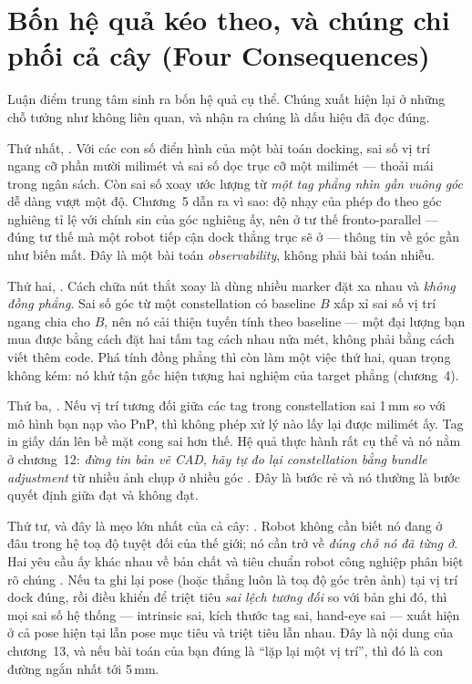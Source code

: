 \documentclass[marker.tex]{subfiles}
\begin{document}
\section*{Bốn hệ quả kéo theo, và chúng chi phối cả cây (Four Consequences)}

Luận điểm trung tâm sinh ra bốn hệ quả cụ thể. Chúng xuất hiện lại ở những chỗ tưởng như không liên quan, và nhận ra chúng là dấu hiệu đã đọc đúng.

Thứ nhất, . Với các con số điển hình của một bài toán docking, sai số vị trí ngang cỡ phần mười milimét và sai số dọc trục cỡ một milimét --- thoải mái trong ngân sách. Còn sai số xoay ước lượng từ \emph{một tag phẳng nhìn gần vuông góc} dễ dàng vượt một độ. Chương~5 dẫn ra vì sao: độ nhạy của phép đo theo góc nghiêng tỉ lệ với chính sin của góc nghiêng ấy, nên ở tư thế fronto-parallel --- đúng tư thế mà một robot tiếp cận dock thẳng trục sẽ ở --- thông tin về góc gần như biến mất. Đây là một bài toán \emph{observability}, không phải bài toán nhiễu.

Thứ hai, . Cách chữa nút thắt xoay là dùng nhiều marker đặt xa nhau và \emph{không đồng phẳng}. Sai số góc từ một constellation có baseline \(B\) xấp xỉ sai số vị trí ngang chia cho \(B\), nên nó cải thiện tuyến tính theo baseline --- một đại lượng bạn mua được bằng cách đặt hai tấm tag cách nhau nửa mét, không phải bằng cách viết thêm code. Phá tính đồng phẳng thì còn làm một việc thứ hai, quan trọng không kém: nó khử tận gốc hiện tượng hai nghiệm của target phẳng (chương~4).

Thứ ba, . Nếu vị trí tương đối giữa các tag trong constellation sai 1\,mm so với mô hình bạn nạp vào PnP, thì không phép xử lý nào lấy lại được milimét ấy. Tag in giấy dán lên bề mặt cong sai hơn thế. Hệ quả thực hành rất cụ thể và nó nằm ở chương~12: \emph{đừng tin bản vẽ CAD, hãy tự đo lại constellation bằng bundle adjustment} từ nhiều ảnh chụp ở nhiều góc \cite{triggs2000bundle}. Đây là bước rẻ và nó thường là bước quyết định giữa đạt và không đạt.

Thứ tư, và đây là mẹo lớn nhất của cả cây: . Robot không cần biết nó đang ở đâu trong hệ toạ độ tuyệt đối của thế giới; nó cần trở về \emph{đúng chỗ nó đã từng ở}. Hai yêu cầu ấy khác nhau về bản chất và tiêu chuẩn robot công nghiệp phân biệt rõ chúng \cite{iso9283}. Nếu ta ghi lại pose (hoặc thẳng luôn là toạ độ góc trên ảnh) tại vị trí dock đúng, rồi điều khiển để triệt tiêu \emph{sai lệch tương đối} so với bản ghi đó, thì mọi sai số hệ thống --- intrinsic sai, kích thước tag sai, hand-eye sai --- xuất hiện ở cả pose hiện tại lẫn pose mục tiêu và triệt tiêu lẫn nhau. Đây là nội dung của chương~13, và nếu bài toán của bạn đúng là ``lặp lại một vị trí'', thì đó là con đường ngắn nhất tới 5\,mm.
\end{document}
